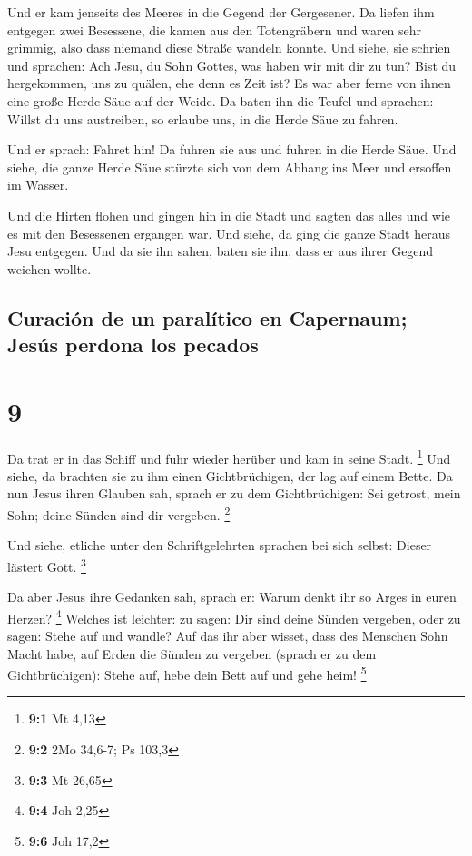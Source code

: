  Und er kam jenseits des Meeres in die Gegend der
Gergesener. Da liefen ihm entgegen zwei Besessene, die kamen aus den
Totengräbern und waren sehr grimmig, also dass niemand diese Straße
wandeln konnte.  Und siehe, sie schrien und sprachen: Ach
Jesu, du Sohn Gottes, was haben wir mit dir zu tun? Bist du hergekommen,
uns zu quälen, ehe denn es Zeit ist?  Es war aber ferne
von ihnen eine große Herde Säue auf der Weide.  Da baten
ihn die Teufel und sprachen: Willst du uns austreiben, so erlaube uns,
in die Herde Säue zu fahren.

 Und er sprach: Fahret hin! Da fuhren sie aus und fuhren
in die Herde Säue. Und siehe, die ganze Herde Säue stürzte sich von dem
Abhang ins Meer und ersoffen im Wasser.

 Und die Hirten flohen und gingen hin in die Stadt und
sagten das alles und wie es mit den Besessenen ergangen war.
 Und siehe, da ging die ganze Stadt heraus Jesu entgegen.
Und da sie ihn sahen, baten sie ihn, dass er aus ihrer Gegend weichen
wollte.

\hypertarget{curaciuxf3n-de-un-paraluxedtico-en-capernaum-jesuxfas-perdona-los-pecados}{%
\subsection{Curación de un paralítico en Capernaum; Jesús perdona los
pecados}\label{curaciuxf3n-de-un-paraluxedtico-en-capernaum-jesuxfas-perdona-los-pecados}}

\hypertarget{section-8}{%
\section{9}\label{section-8}}

 Da trat er in das Schiff und fuhr wieder herüber und kam
in seine Stadt. \footnote{\textbf{9:1} Mt 4,13}  Und
siehe, da brachten sie zu ihm einen Gichtbrüchigen, der lag auf einem
Bette. Da nun Jesus ihren Glauben sah, sprach er zu dem Gichtbrüchigen:
Sei getrost, mein Sohn; deine Sünden sind dir vergeben. \footnote{\textbf{9:2}
  2Mo 34,6-7; Ps 103,3}

 Und siehe, etliche unter den Schriftgelehrten sprachen
bei sich selbst: Dieser lästert Gott. \footnote{\textbf{9:3} Mt 26,65}

 Da aber Jesus ihre Gedanken sah, sprach er: Warum denkt
ihr so Arges in euren Herzen? \footnote{\textbf{9:4} Joh 2,25}
 Welches ist leichter: zu sagen: Dir sind deine Sünden
vergeben, oder zu sagen: Stehe auf und wandle?  Auf das
ihr aber wisset, dass des Menschen Sohn Macht habe, auf Erden die Sünden
zu vergeben (sprach er zu dem Gichtbrüchigen): Stehe auf, hebe dein Bett
auf und gehe heim! \footnote{\textbf{9:6} Joh 17,2}

